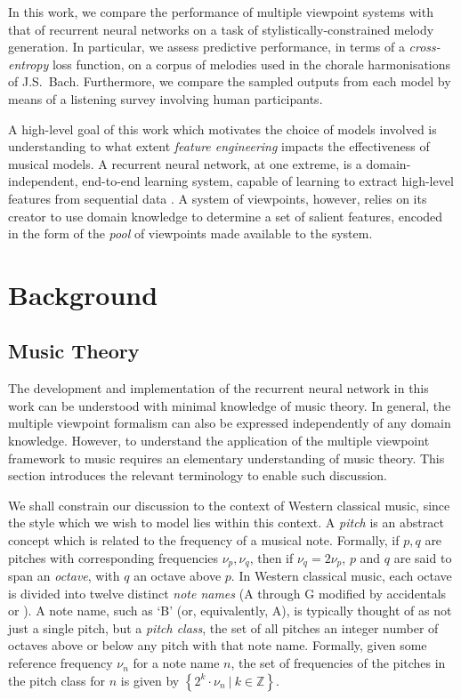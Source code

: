 \documentclass[12pt,a4paper,twoside,openright]{report}
\newcommand{\set}[1]{ \left\{ #1 \right\} }
\newcommand{\insharp}[0]{\sharp[raise=0.1,scale=0.8]}
\newcommand{\inflat}[0]{\flat[raise=0.1,scale=0.8]}
\begin{document}
In this work, we compare the performance of multiple viewpoint systems with that
of recurrent neural networks on a task of stylistically-constrained melody
generation. In particular, we assess predictive performance, in terms of a
\emph{cross-entropy} loss function, on a corpus of melodies used in the chorale
harmonisations of J.S.\ Bach. Furthermore, we compare the sampled outputs from
each model by means of a listening survey involving human participants.

A high-level goal of this work which motivates the choice of models involved is
understanding to what extent \emph{feature engineering} impacts the
effectiveness of musical models. A recurrent neural network, at one extreme, is
a domain-independent, end-to-end learning system, capable of learning to extract
high-level features from sequential data \cite{Goodfellow-et-al-2016}. A system
of viewpoints, however, relies on its creator to use domain knowledge to
determine a set of salient features, encoded in the form of the \emph{pool} of
viewpoints made available to the system.

\section{Background}

\subsection{Music Theory}

The development and implementation of the recurrent neural network in this work
can be understood with minimal knowledge of music theory. In general, the
multiple viewpoint formalism can also be expressed independently of any domain
knowledge.  However, to understand the application of the multiple viewpoint
framework to music requires an elementary understanding of music theory.  This
section introduces the relevant terminology to enable such discussion.

We shall constrain our discussion to the context of Western classical music,
since the style which we wish to model lies within this context. A \emph{pitch}
is an abstract concept which is related to the frequency of a musical note.
Formally, if $p,q$ are pitches with corresponding frequencies $\nu_p,\nu_q$,
then if $\nu_q = 2\nu_p$, $p$ and $q$ are said to span an \emph{octave}, with
$q$ an octave above $p$. In Western classical music, each octave is divided into
twelve distinct \emph{note names} (A through G modified by accidentals
\insharp{} or \inflat{}). A note name, such as `B\inflat' (or, equivalently,
A\insharp), is typically thought of as not just a single pitch, but a
\emph{pitch class}, the set of all pitches an integer number of octaves above or
below any pitch with that note name.  Formally, given some reference frequency
$\nu_n$ for a note name $n$, the set of frequencies of the pitches in the pitch
class for $n$ is given by $\set{ 2^k \cdot \nu_n\ |\ k \in \mathbb{Z} }.$
\end{document}
